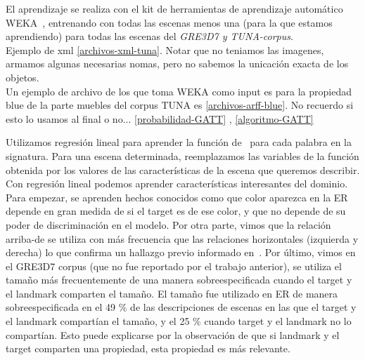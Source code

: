 El aprendizaje se realiza con el kit de herramientas de aprendizaje autom\'atico
WEKA~\cite{Hall:WEK09}, entrenando con todas las escenas menos una (para la que estamos aprendiendo) para todas las escenas del \textit{GRE3D7 y TUNA-corpus}. \\
Ejemplo de xml \ref{archivos-xml-tuna}. Notar que no teniamos las imagenes, armamos algunas necesarias nomas, pero no sabemos la unicaci\'on exacta de los objetos.\\

Un ejemplo de archivo de los que toma WEKA como input es para la propiedad blue de la parte muebles del corpus TUNA es \ref{archivos-arff-blue}. 
No recuerdo si esto lo usamos al final o no...
\ref{probabilidad-GATT} , \ref{algoritmo-GATT} 

Utilizamos regresi\'on lineal para aprender la funci\'on de
\puse\ para cada palabra en la signatura. Para una escena determinada, reemplazamos
las variables de la funci\'on obtenida por los valores de las caracter\'{i}sticas
de la escena que queremos describir.\\

Con regresi\'on lineal podemos aprender caracter\'{i}sticas interesantes
 del dominio. Para empezar, se aprenden hechos conocidos
como que color aparezca en la ER depende en gran medida de si el
target es de ese color, y que no depende de su
poder de discriminaci\'on en el modelo. Por otra parte, vimos que la relaci\'on arriba-de
 se utiliza con m\'as frecuencia que las relaciones horizontales
(izquierda y derecha) lo que confirma un hallazgo previo informado
en~\cite{viet:gene11}. Por \'ultimo, vimos en el
GRE3D7 corpus (que no fue reportado por el trabajo anterior), se utiliza el tama\~no
m\'as frecuentemente de una manera sobreespecificada cuando el
target y el landmark comparten el tama\~no. El tama\~no fue utilizado en ER de manera sobreespecificada en el 49 \% de
las descripciones de escenas en las que el target y el landmark compart\'ian el tama\~no,
y el 25 \% cuando target y el landmark no lo compart\'ian. Esto puede explicarse por la observaci\'on de que si landmark y el target comparten una propiedad, esta propiedad es m\'as relevante.




